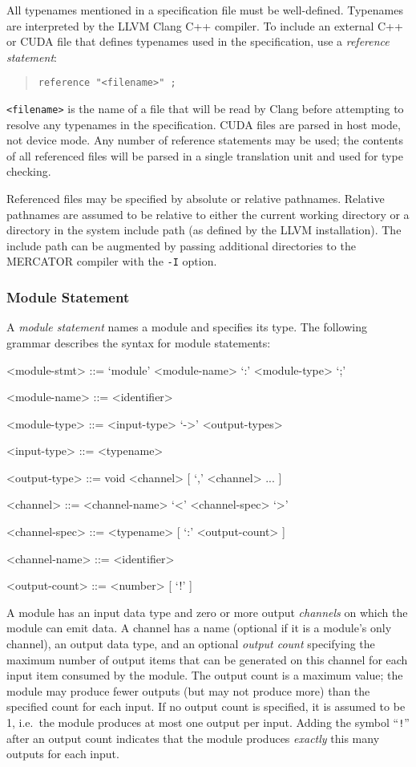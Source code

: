 \documentclass[11pt]{article}
\begin{document}
All typenames mentioned in a specification file must be well-defined.
Typenames are interpreted by the LLVM Clang C++ compiler.  To include
an external C++ or CUDA file that defines typenames used in the
specification, use a \textit{reference statement}:
\begin{quote}
\texttt{reference "<filename>" ;}
\end{quote}
\texttt{<filename>} is the name of a file that will be read by Clang
before attempting to resolve any typenames in the specification.  CUDA
files are parsed in host mode, not device mode.  Any number of
reference statements may be used; the contents of all referenced files
will be parsed in a single translation unit and used for type
checking.

Referenced files may be specified by absolute or relative pathnames.
Relative pathnames are assumed to be relative to either the current
working directory or a directory in the system include path (as
defined by the LLVM installation).  The include path can be augmented
by passing additional directories to the MERCATOR compiler with
the \texttt{-I} option.

\subsubsection{Module Statement}

A \textit{module statement} names a module and specifies its type.
The following grammar describes the syntax for module statements:
\begin{grammar}

<module-stmt> ::= `module' <module-name> `:' <module-type> `;'

<module-name> ::= <identifier>

<module-type> ::= <input-type> `->' <output-types>

<input-type> ::= <typename>

<output-type> ::= void
\alt <channel> [ `,' <channel> ... ]

<channel> ::= <channel-name> `<' <channel-spec> `>'

<channel-spec> ::= <typename> [ `:' <output-count> ]

<channel-name> ::= <identifier>

<output-count> ::= <number> [ `!' ]

\end{grammar}

A module has an input data type and zero or more output
\emph{channels} on which the module can emit data.  A channel has a
name (optional if it is a module's only channel), an output data type,
and an optional \emph{output count} specifying the maximum number of
output items that can be generated on this channel for each input item
consumed by the module.  The output count is a maximum value; the
module may produce fewer outputs (but may not produce more) than the
specified count for each input.  If no output count is specified, it
is assumed to be 1, i.e.\ the module produces at most one output per
input.  Adding the symbol ``\texttt{!}''  after an output count
indicates that the module produces \emph{exactly} this many outputs
for each input.
\end{document}
